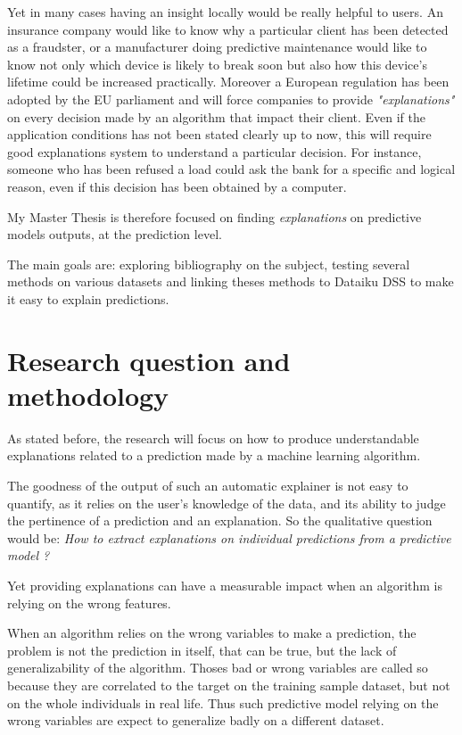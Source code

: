 \documentclass[a4paper]{article}
\begin{document}
Yet in many cases having an insight locally would be really helpful to users. An insurance company would like to know why a particular client has been detected as a fraudster, or a manufacturer doing predictive maintenance would like to know not only which device is likely to break soon but also how this device's lifetime could be increased practically. Moreover a European regulation has been adopted by the EU parliament and will force companies to provide \textit{"explanations"} on every decision made by an algorithm that impact their client. Even if the application conditions has not been stated clearly up to now, this will require good explanations system to understand a particular decision. For instance, someone who has been refused a load could ask the bank for a specific and logical reason, even if this decision has been obtained by a computer.

My Master Thesis is therefore focused on finding \textit{explanations} on predictive models outputs, at the prediction level.

The main goals are: exploring bibliography on the subject, testing several methods on various datasets and linking theses methods to Dataiku DSS to make it easy to explain predictions.

\section{Research question and methodology}

As stated before, the research will focus on how to produce understandable explanations related to a prediction made by a machine learning algorithm.

The goodness of the output of such an automatic explainer is not easy to quantify, as it relies on the user's knowledge of the data, and its ability to judge the pertinence of a prediction and an explanation. So the qualitative question would be: \textit{How to extract explanations on individual predictions from a predictive model ?}

Yet providing explanations can have a measurable impact when an algorithm is relying on the wrong features.

When an algorithm relies on the wrong variables to make a prediction, the problem is not the prediction in itself, that can be true, but the lack of generalizability of the algorithm. Thoses bad or wrong variables are called so because they are correlated to the target on the training sample dataset, but not on the whole individuals in real life. Thus such predictive model relying on the wrong variables are expect to generalize badly on a different dataset.
\end{document}
